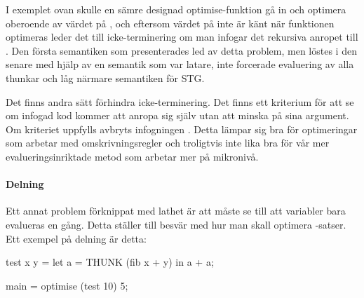 \documentclass[Rapport]{subfiles}
\begin{document}
I exemplet ovan skulle en sämre designad optimise-funktion gå in och optimera  oberoende av värdet på
, och eftersom värdet på  inte är känt när funktionen optimeras leder det till
icke-terminering om man infogar det rekursiva anropet till .
    Den första semantiken som presenterades led av detta problem, men löstes i den senare med hjälp av
en semantik som var latare, inte forcerade evaluering av alla thunkar och låg närmare semantiken för STG.

Det finns andra sätt förhindra icke-terminering.
Det finns ett kriterium för att se om infogad kod kommer att anropa sig själv 
utan att minska på sina argument. Om kriteriet uppfylls avbryts infogningen 
\cite{mitchell2007supercompiler}. Detta lämpar sig bra för optimeringar som 
arbetar med omskrivningsregler och troligtvis inte lika bra för vår mer 
evalueringsinriktade metod som arbetar mer på mikronivå.

\begin{comment}
\subsection{Optimise-with}
En annan möjlig lösning på problemet ovan är att låta programmeraren själv avgöra hur
många gånger en funktion får infogas, som här:

\begin{codeEx}
main = optimise (take 5) with { inline take 5 } [1,2,3,4,5,6,7];
\end{codeEx}

I exemplet ovan betyder \ic{inline take 5} att \ic{take} bara får infogas $5$ gånger.
En funktionalitet som skulle kunna gynna optimise, eller användandet av den,
är att den skulle kunna detektera när den potentiellt skulle falla in i en
oändlig infogningsloop. Det har inte gjorts till det här arbetet.
\end{comment}

\paragraph{Delning}
Ett annat problem förknippat med lathet är att  måste se till att variabler bara 
evalueras en gång. Detta ställer till besvär med hur man skall optimera -satser.
Ett exempel på delning är detta:

\begin{codeEx}
test x y = let
    { a = THUNK (fib x + y)
    } in a + a;

main = optimise (test 10) 5;
\end{codeEx}
\end{document}
